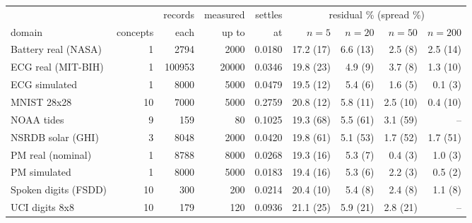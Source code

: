\begin{tabular}{lrrrrrrrr}
\toprule
& & records & measured & settles & \multicolumn{4}{c}{residual \% (spread \%)} \\
\cmidrule(lr){6-9}
domain & concepts & each & up to & at & $n{=}5$ & $n{=}20$ & $n{=}50$ & $n{=}200$ \\
\midrule
Battery real (NASA) & 1 & 2794 & 2000 & 0.0180 & 17.2 (17) & 6.6 (13) & 2.5 (8) & 2.5 (14) \\
ECG real (MIT-BIH) & 1 & 100953 & 20000 & 0.0346 & 19.8 (23) & 4.9 (9) & 3.7 (8) & 1.3 (10) \\
ECG simulated & 1 & 8000 & 5000 & 0.0479 & 19.5 (12) & 5.4 (6) & 1.6 (5) & 0.1 (3) \\
MNIST 28x28 & 10 & 7000 & 5000 & 0.2759 & 20.8 (12) & 5.8 (11) & 2.5 (10) & 0.4 (10) \\
NOAA tides & 9 & 159 & 80 & 0.1025 & 19.3 (68) & 5.5 (61) & 3.1 (59) & -- \\
NSRDB solar (GHI) & 3 & 8048 & 2000 & 0.0420 & 19.8 (61) & 5.1 (53) & 1.7 (52) & 1.7 (51) \\
PM real (nominal) & 1 & 8788 & 8000 & 0.0268 & 19.3 (16) & 5.3 (7) & 0.4 (3) & 1.0 (3) \\
PM simulated & 1 & 8000 & 5000 & 0.0183 & 19.4 (16) & 5.3 (6) & 2.2 (3) & 0.5 (2) \\
Spoken digits (FSDD) & 10 & 300 & 200 & 0.0214 & 20.4 (10) & 5.4 (8) & 2.4 (8) & 1.1 (8) \\
UCI digits 8x8 & 10 & 179 & 120 & 0.0936 & 21.1 (25) & 5.9 (21) & 2.8 (21) & -- \\
\bottomrule
\end{tabular}
